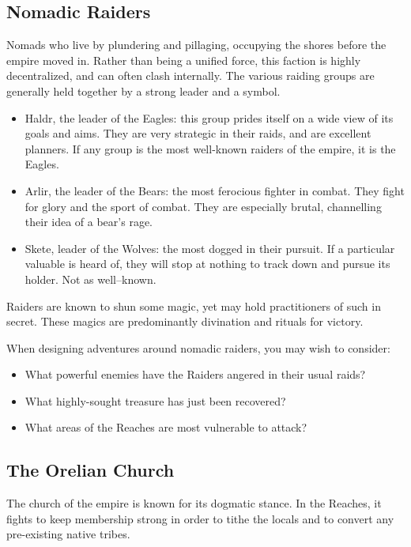 \documentclass[notitlepage]{article}
\begin{document}
\begin{multicols*}{2}
  \subsection*{Nomadic Raiders}

  Nomads who live by plundering and pillaging, occupying the shores before the empire moved in.
  Rather than being a unified force, this faction is highly decentralized, and can often clash internally.
  The various raiding groups are generally held together by a strong leader and a symbol.

  \begin{itemize}
  \item Haldr, the leader of the Eagles: this group prides itself on a wide view of its goals and aims. They are very strategic in their raids, and are excellent planners. If any group is the most well-known raiders of the empire, it is the Eagles.
  \item Arlir, the leader of the Bears: the most ferocious fighter in combat. They fight for glory and the sport of combat. They are especially brutal, channelling their idea of a bear's rage.
  \item Skete, leader of the Wolves: the most dogged in their pursuit. If a particular valuable is heard of, they will stop at nothing to track down and pursue its holder. Not as well--known.
  \end{itemize}

  Raiders are known to shun some magic, yet may hold practitioners of such in secret. These magics are predominantly divination and rituals for victory.

  When designing adventures around nomadic raiders, you may wish to consider:

  \begin{itemize}
  \item What powerful enemies have the Raiders angered in their usual raids?
  \item What highly-sought treasure has just been recovered?
  \item What areas of the Reaches are most vulnerable to attack?
  \end{itemize}

  \subsection*{The Orelian Church}

  The church of the empire is known for its dogmatic stance.
  In the Reaches, it fights to keep membership strong in order to tithe the locals and to convert any pre-existing native tribes. \\
  

\end{multicols*}
\end{document}
